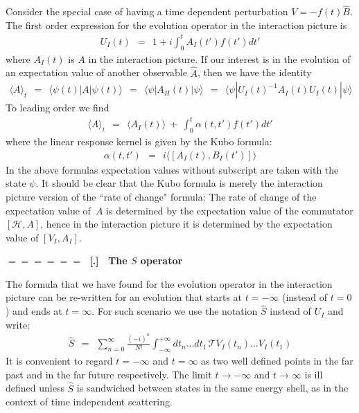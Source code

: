 \documentclass[onecolumn,fleqn]{revtex4}
\newcommand{\beq}{\begin{eqnarray}}
\newcommand{\eeq}{\end{eqnarray}}
\renewcommand{\thesubsection}{\arabic{subsection}}
\renewcommand{\thesubsubsection}{\arabic{subsubsection}}
\newcommand{\sheadC}[1]
{
\addtocounter{subsubsection}{1}
\vspace{5mm}
{\Large\bf $=\!=\!=\!=\!=\!=\;$ [\thesubsection.\thesubsubsection] \ #1}  
\nopagebreak
\phantomsection
}
\begin{document}
Consider the special case of having 
a time dependent perturbation $V=-f(t)\hat{B}$. 
The first order expression for the 
evolution operator in the interaction picture is  
\beq
U_I(t) \ \ = \ \ 1 + i\int_{0}^{t} A_I(t') f(t')dt' 
\eeq
where $A_I(t)$ is $A$ in the interaction picture. 
If our interest is in the evolution of an expectation value 
of another observable $\hat{A}$, then we have the identity
\beq
\langle A \rangle_t  
\ \ = \ \ 
\langle\psi(t)|A|\psi(t)\rangle 
\ \ = \ \ 
\langle\psi|A_H(t)|\psi\rangle
\ \ = \ \ 
\langle\psi|U_I(t)^{-1} A_I(t) U_I(t)|\psi\rangle
\eeq
To leading order we find 
\beq
\langle A \rangle_t  
\ \ = \ \ 
\langle A_I(t) \rangle \ + \ \int_0^t \alpha(t,t') f(t') dt'
\eeq
where the linear response kernel 
is given by the Kubo formula: 
\beq
\alpha(t,t') \ \ = \ \ 
i\langle[A_I(t),B_I(t')]\rangle
\eeq
In the above formulas expectation values 
without subscript are taken with the state $\psi$. 
It should be clear that the Kubo formula is 
merely the interaction picture version 
of the ``rate of change" formula: 
The rate of change of the expectation value of~$A$ 
is determined by the expectation value of 
the commutator $[\mathcal{H},A]$, hence in 
the interaction picture it is determined 
by the expectation value of $[V_I,A_I]$. 



\sheadC{The $S$ operator}

The formula that we have found for the evolution 
operator in the interaction picture can 
be re-written for an evolution that starts 
at ${t=-\infty}$ (instead of $t=0$) and ends at ${t=\infty}$. 
For such scenario we use the notation $\hat{S}$ 
instead of $U_I$ and write: 
\beq
\hat{S} \ \ = \ \ 
\sum_{n=0}^{\infty}\frac{(-i)^{n}}{N!} 
\int_{-\infty}^{+\infty} dt_{n}\dots dt_{1} \, \mathcal{T} V_I(t_{n})\dots V_I(t_{1})
\eeq
It is convenient to regard ${t=-\infty}$ and ${t=\infty}$ 
as two well defined points in the far past and in the 
far future respectively. The limit 
${t\rightarrow-\infty}$ and  ${t\rightarrow\infty}$ 
is ill defined unless $\hat{S}$ is sandwiched 
between states in the same energy shell, 
as in the context of time independent scattering. 
\end{document}
